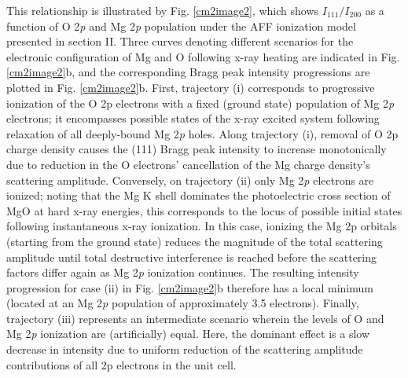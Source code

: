 This relationship is illustrated by Fig. \ref{cm2image2}, which shows
\(I_{111}/I_{200}\) as a function of O 2\emph{p} and Mg 2\emph{p}
population under the AFF ionization model presented in section II. Three
curves denoting different scenarios for the electronic configuration of
Mg and O following x-ray heating are indicated in Fig. \ref{cm2image2}b, and the
corresponding Bragg peak intensity progressions are plotted in Fig. \ref{cm2image2}b.
First, trajectory (i) corresponds to progressive ionization of the O 2p
electrons with a fixed (ground state) population of Mg 2\emph{p}
electrons; it encompasses possible states of the x-ray excited system
following relaxation of all deeply-bound Mg 2\emph{p} holes. Along
trajectory (i), removal of O 2p charge density causes the (111) Bragg
peak intensity to increase monotonically due to reduction in the O
electrons' cancellation of the Mg charge density's scattering amplitude.
Conversely, on trajectory (ii) only Mg 2\emph{p} electrons are ionized;
noting that the Mg K shell dominates the photoelectric cross section of
MgO at hard x-ray energies, this corresponds to the locus of possible
initial states following instantaneous x-ray ionization. In this case,
ionizing the Mg 2p orbitals (starting from the ground state) reduces the
magnitude of the total scattering amplitude until total destructive
interference is reached before the scattering factors differ again as Mg
2\emph{p} ionization continues. The resulting intensity progression for
case (ii) in Fig. \ref{cm2image2}b therefore has a local minimum (located at an Mg
2\emph{p} population of approximately 3.5 electrons). Finally,
trajectory (iii) represents an intermediate scenario wherein the levels
of O and Mg 2\emph{p} ionization are (artificially) equal. Here, the
dominant effect is a slow decrease in intensity due to uniform reduction
of the scattering amplitude contributions of all 2p electrons in the
unit cell.

